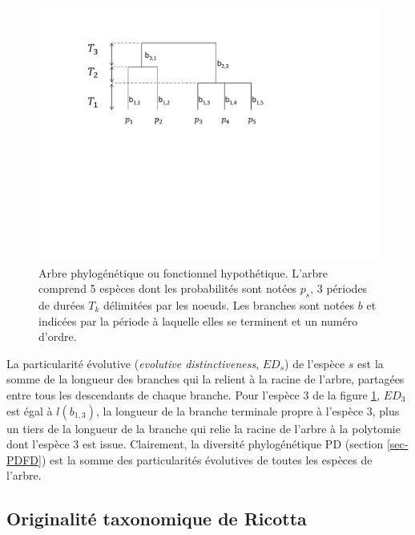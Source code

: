 \documentclass[
  11pt,
  french,
  a4paper,
  extrafontsizes,onecolumn,openright
  ]{memoir}
\begin{document}
\scriptsize

\begin{figure}

{\centering \includegraphics[width=0.8\linewidth]{images/ArbreA} 

}

\caption{Arbre phylogénétique ou fonctionnel hypothétique. L'arbre comprend 5 espèces dont les probabilités sont notées \(p_s\), 3 périodes de durées \(T_k\) délimitées par les noeuds. Les branches sont notées \(b\) et indicées par la période à laquelle elles se terminent et un numéro d'ordre.}\label{fig:ArbreA4}
\end{figure}

\normalsize

La particularité évolutive \autocite{Isaac2007} (\emph{evolutive distinctiveness}, \(\mathit{ED}_s\)) de l'espèce \(s\) est la somme de la longueur des branches qui la relient à la racine de l'arbre, partagées entre tous les descendants de chaque branche.
Pour l'espèce 3 de la figure \ref{fig:ArbreA4}, \(\mathit{ED}_3\) est égal à \(l(b_{1,3})\), la longueur de la branche terminale propre à l'espèce 3, plus un tiers de la longueur de la branche qui relie la racine de l'arbre à la polytomie dont l'espèce 3 est issue.
Clairement, la diversité phylogénétique PD (section \ref{sec-PDFD}) est la somme des particularités évolutives de toutes les espèces de l'arbre.

\subsection{Originalité taxonomique de Ricotta}\label{sec-OrigTax}



\scriptsize
\end{document}
